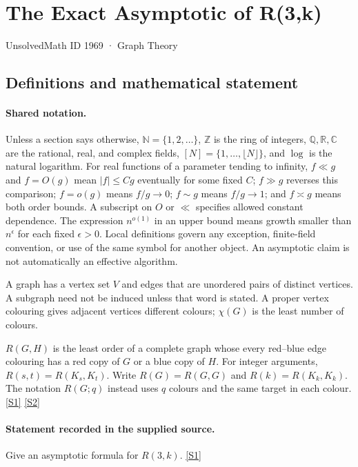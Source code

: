 \documentclass[11pt,a4paper]{article}
\newcommand{\N}{\mathbb{N}}
\newcommand{\Z}{\mathbb{Z}}
\newcommand{\Q}{\mathbb{Q}}
\newcommand{\R}{\mathbb{R}}
\newcommand{\C}{\mathbb{C}}
\newcommand{\sref}[2]{\hyperlink{source:#1:#2}{[S#2]}}
\begin{document}

\setcounter{section}{1968}

\section{The Exact Asymptotic of R(3,k)}\label{1969}

{\small\sffamily UnsolvedMath ID 1969 · Graph Theory}

\subsection{Definitions and mathematical statement}

\paragraph{Shared notation.}Unless a section says otherwise, $\N=\{1,2,\ldots\}$,
$\Z$ is the ring of integers, $\Q,\R,\C$ are the rational, real, and complex
fields, $[N]=\{1,\ldots,\lfloor N\rfloor\}$, and $\log$ is the natural
logarithm. For real functions of a parameter tending to infinity,
$f\ll g$ and $f=O(g)$ mean $|f|\leq Cg$ eventually for some fixed $C$;
$f\gg g$ reverses this comparison; $f=o(g)$ means $f/g\to0$;
$f\sim g$ means $f/g\to1$; and $f\asymp g$ means both order bounds.
A subscript on $O$ or $\ll$ specifies allowed constant dependence.
The expression $n^{o(1)}$ in an upper bound means growth smaller than
$n^\epsilon$ for each fixed $\epsilon>0$. Local definitions govern any
exception, finite-field convention, or use of the same symbol for another
object. An asymptotic claim is not automatically an effective algorithm.



A graph has a vertex set $V$ and edges that are unordered pairs of distinct vertices. A subgraph need not be induced unless that word is stated. A proper vertex colouring gives adjacent vertices different colours; $\chi(G)$ is the least number of colours.

$R(G,H)$ is the least order of a complete graph whose every red--blue edge colouring has a red copy of $G$ or a blue copy of $H$. For integer arguments, $R(s,t)=R(K_s,K_t)$. Write $R(G)=R(G,G)$ and $R(k)=R(K_k,K_k)$. The notation $R(G;q)$ instead uses $q$ colours and the same target in each colour. \sref{1969}{1} \sref{1969}{2}

\paragraph{Statement recorded in the supplied source.}
Give an asymptotic formula for $R(3,k)$. \sref{1969}{1}
\end{document}
